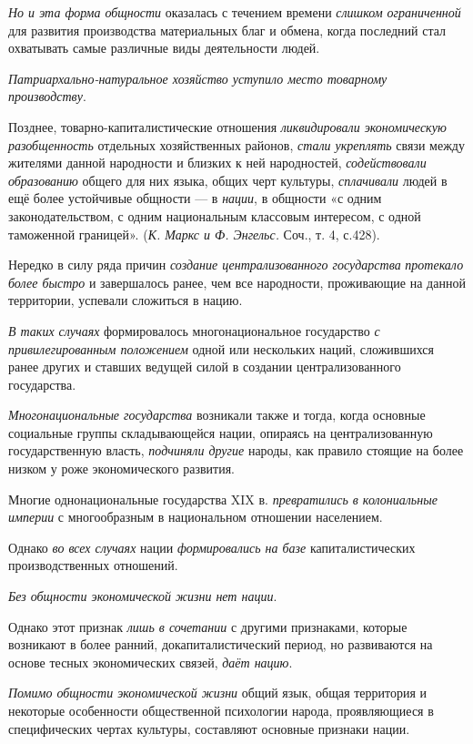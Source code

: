\documentclass[a4paper,14pt,russian]{extreport}
\begin{document}
\emph{Но и эта форма общности} оказалась с течением времени \emph{слишком ограниченной} для развития производства материальных благ и обмена, когда последний стал охватывать самые различные виды деятельности людей.

\emph{Патриархально-натуральное хозяйство уступило место товарному производству}.

Позднее, товарно-капиталистические отношения \emph{ликвидировали экономическую разобщенность} отдельных хозяйственных районов, \emph{стали укреплять} связи между жителями данной народности и близких к ней народностей, \emph{содействовали образованию} общего для них языка, общих черт культуры, \emph{сплачивали} людей в ещё более устойчивые общности --- в \emph{нации}, в общности «с одним законодательством, с одним национальным классовым интересом, с одной таможенной границей». (\emph{К. Маркс и Ф. Энгельс.} Соч., т. 4, с.428).

Нередко в силу ряда причин \emph{создание централизованного государства} \emph{протекало более быстро} и завершалось ранее, чем все народности, проживающие на данной территории, успевали сложиться в нацию.

\emph{В таких случаях} формировалось многонациональное государство \emph{с привилегированным положением} одной или нескольких наций, сложившихся ранее других и ставших ведущей силой в создании централизованного государства.

\emph{Многонациональные государства} возникали также и тогда, когда основные социальные группы складывающейся нации, опираясь на централизованную государственную власть, \emph{подчиняли другие} народы, как правило стоящие на более низком у роже экономического развития.

Многие однонациональные государства XIX в. \emph{превратились в колониальные империи} с многообразным в национальном отношении населением.

Однако \emph{во всех случаях} нации \emph{формировались на базе} капиталистических производственных отношений.

\emph{Без общности экономической жизни нет нации}.

Однако этот признак \emph{лишь в сочетании} с другими признаками, которые возникают в более ранний, докапиталистический период, но развиваются на основе тесных экономических связей, \emph{даёт нацию}.

\emph{Помимо общности экономической жизни} общий язык, общая территория и некоторые особенности общественной психологии народа, проявляющиеся в специфических чертах культуры, составляют основные признаки нации.
\end{document}
